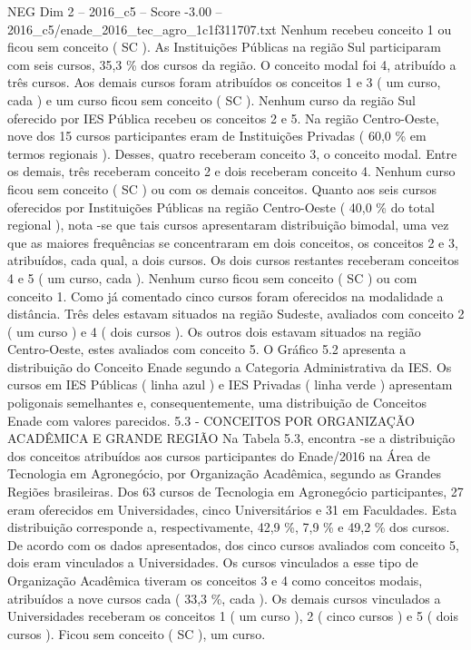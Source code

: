 \begin{textsample}{NEG Dim 2 – 2016\_c5 – Score -3.00 – 2016\_c5/enade\_2016\_tec\_agro\_1c1f311707.txt}
Nenhum recebeu conceito 1 ou ficou sem conceito ( SC ).
As Instituições Públicas na região Sul participaram com seis cursos, 35,3 \% dos cursos da região.
O conceito modal foi 4, atribuído a três cursos.
Aos demais cursos foram atribuídos os conceitos 1 e 3 ( um curso, cada ) e um curso ficou sem conceito ( SC ).
Nenhum curso da região Sul oferecido por IES Pública recebeu os conceitos 2 e 5.
Na região Centro-Oeste, nove dos 15 cursos participantes eram de Instituições Privadas ( 60,0 \% em termos regionais ).
Desses, quatro receberam conceito 3, o conceito modal.
Entre os demais, três receberam conceito 2 e dois receberam conceito 4.
Nenhum curso ficou sem conceito ( SC ) ou com os demais conceitos.
Quanto aos seis cursos oferecidos por Instituições Públicas na região Centro-Oeste ( 40,0 \% do total regional ), nota -se que tais cursos apresentaram distribuição bimodal, uma vez que as maiores frequências se concentraram em dois conceitos, os conceitos 2 e 3, atribuídos, cada qual, a dois cursos.
Os dois cursos restantes receberam conceitos 4 e 5 ( um curso, cada ).
Nenhum curso ficou sem conceito ( SC ) ou com conceito 1.
Como já comentado cinco cursos foram oferecidos na modalidade a distância.
Três deles estavam situados na região Sudeste, avaliados com conceito 2 ( um curso ) e 4 ( dois cursos ).
Os outros dois estavam situados na região Centro-Oeste, estes avaliados com conceito 5.
O Gráfico 5.2 apresenta a distribuição do Conceito Enade segundo a Categoria Administrativa da IES.
Os cursos em IES Públicas ( linha azul ) e IES Privadas ( linha verde ) apresentam poligonais semelhantes e, consequentemente, uma distribuição de Conceitos Enade com valores parecidos. 5.3 - CONCEITOS POR ORGANIZAÇÃO ACADÊMICA E GRANDE REGIÃO Na Tabela 5.3, encontra -se a distribuição dos conceitos atribuídos aos cursos participantes do Enade/2016 na Área de Tecnologia em Agronegócio, por Organização Acadêmica, segundo as Grandes Regiões brasileiras.
Dos 63 cursos de Tecnologia em Agronegócio participantes, 27 eram oferecidos em Universidades, cinco Universitários e 31 em Faculdades.
Esta distribuição corresponde a, respectivamente, 42,9 \%, 7,9 \% e 49,2 \% dos cursos.
De acordo com os dados apresentados, dos cinco cursos avaliados com conceito 5, dois eram vinculados a Universidades.
Os cursos vinculados a esse tipo de Organização Acadêmica tiveram os conceitos 3 e 4 como conceitos modais, atribuídos a nove cursos cada ( 33,3 \%, cada ).
Os demais cursos vinculados a Universidades receberam os conceitos 1 ( um curso ), 2 ( cinco cursos ) e 5 ( dois cursos ).
Ficou sem conceito ( SC ), um curso.

\end{textsample}
